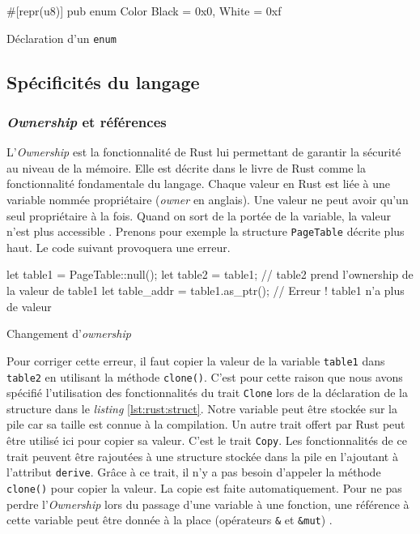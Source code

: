 \begin{code}
\begin{rustcode}
#[repr(u8)]
pub enum Color {
    Black = 0x0,
    White = 0xf
}
\end{rustcode}
\caption{Déclaration d'un \texttt{enum}}
\label{lst:rust:enum}
\end{code} \bigbreak


\subsection{Spécificités du langage}
\subsubsection{\textit{Ownership} et références}
L'\textit{Ownership} est la fonctionnalité de Rust lui permettant de garantir la
sécurité au niveau de la mémoire. Elle est décrite dans le livre de Rust comme
la fonctionnalité fondamentale du langage. Chaque valeur en Rust est liée à une
variable nommée propriétaire (\textit{owner} en anglais). Une valeur
ne peut avoir qu'un seul propriétaire à la fois. Quand on sort de la portée de
la variable, la valeur n'est plus accessible \cite{ref2}. Prenons pour exemple
la structure \texttt{PageTable} décrite plus haut. Le code suivant
provoquera une erreur.

\begin{code}
\begin{rustcode}
let table1 = PageTable::null();
let table2 = table1;              // table2 prend l'ownership de la valeur de table1
let table_addr = table1.as_ptr(); // Erreur ! table1 n'a plus de valeur
\end{rustcode}
\caption{Changement d'\textit{ownership}}
\label{lst:rust:ownership}
\end{code} \bigbreak

Pour corriger cette erreur, il faut copier la valeur de la variable \texttt{table1}
dans \texttt{table2} en utilisant la méthode \texttt{clone()}.
C'est pour cette raison que nous avons spécifié l'utilisation des fonctionnalités
du trait \texttt{Clone} lors de la déclaration de la structure dans
le \textit{listing} \ref{lst:rust:struct}. Notre variable peut être stockée sur
la pile car sa taille est connue à la compilation. Un autre trait
offert par Rust peut être utilisé ici pour copier sa valeur. C'est le trait
\texttt{Copy}. Les fonctionnalités de ce trait
peuvent être rajoutées à une structure stockée dans la pile en l'ajoutant à l'attribut
\texttt{derive}. Grâce à ce trait, il n'y a pas besoin
d'appeler la méthode \texttt{clone()} pour copier la valeur. La copie
est faite automatiquement. Pour ne pas perdre l'\textit{Ownership} lors du passage
d'une variable à une fonction, une référence à cette variable peut être donnée
à la place (opérateurs \texttt{&} et \texttt{&mut}) \cite{ref2}.

